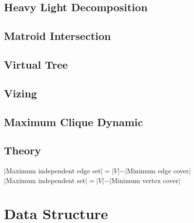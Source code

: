 \subsection{Heavy Light Decomposition}

\subsection{Matroid Intersection}

%
%
\subsection{Virtual Tree}

\subsection{Vizing}

\subsection{Maximum Clique Dynamic}


\subsection{Theory}
\begin{footnotesize}
$|$Maximum independent edge set$|=|V|-|$Minimum edge cover$|$\\
$|$Maximum independent set$|=|V|-|$Minimum vertex cover$|$\\
\end{footnotesize}

\section{Data Structure}
%
%
